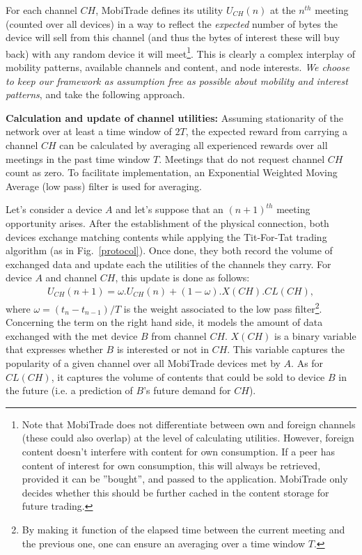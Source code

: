 For each channel $CH$, MobiTrade defines its utility $U_{CH}(n)$ at the $n^{th}$ meeting (counted over all devices) in a way to reflect the \emph{expected} number of bytes the device will sell from this channel (and thus the bytes of interest these will buy back) with any random device it will meet\footnote{Note that MobiTrade does not differentiate between own and foreign channels (these could also overlap) at the level of calculating utilities. However, foreign content doesn't interfere with content for own consumption. If a peer has content of interest for own consumption, this will always be retrieved, provided it can be ''bought'', and passed to the application. MobiTrade only decides whether this should be further cached in the content storage for future trading.}. This is clearly a complex interplay of mobility patterns, available channels and content, and node interests. \emph{We choose to keep our framework as assumption free as possible about mobility and interest patterns}, and take the following approach.

\noindent \textbf{Calculation and update of channel utilities:}
Assuming stationarity of the network over at least a time window of $2T$, the expected reward from carrying a channel $CH$ can be calculated by averaging all experienced rewards over all meetings in the past time window $T$. Meetings that do not request channel $CH$ count as zero. To facilitate implementation, an Exponential Weighted Moving Average (low pass) filter is used for averaging.

Let's consider a device $A$ and let's suppose that an $(n+1)^{th}$ meeting opportunity arises. After the establishment of the physical connection, both devices exchange matching contents while applying the Tit-For-Tat trading algorithm (as in Fig.~\ref{protocol}). Once done, they both record the volume of exchanged data and update each the utilities of the channels they carry. For device $A$ and channel $CH$, this update is done as follows:
\begin{eqnarray*}
U_{CH}(n+1) = \omega . U_{CH}(n) + (1 - \omega) . X(CH) . CL(CH),
\label{eq:utility-updating}
\end{eqnarray*}
where $\omega = (t_{n}-t_{n-1})/T$ is the weight associated to the low pass filter\footnote{By making it function of the elapsed time between the current meeting and the previous one, one can ensure an averaging over a time window $T$.}. Concerning the term on the right hand side, it models the amount of data exchanged with the met device $B$ from channel $CH$. $X(CH)$ is a binary variable that expresses whether $B$ is interested or not in $CH$. This variable captures the popularity of a given channel over all MobiTrade devices met by $A$. As for $CL(CH)$, it captures the volume of contents that could be sold to device $B$ in the future (i.e. a prediction of $B$'s future demand for $CH$).

